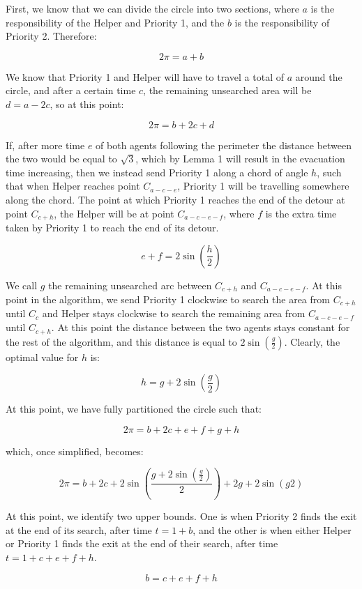 \documentclass[11pt]{article}
\begin{document}
\begin{flushleft}
    First, we know that we can divide the circle into two sections, where $a$ is the
    responsibility of the Helper and Priority 1, and the $b$ is the responsibility of Priority 2.
    Therefore:

    \[ 2\pi = a + b \]

    We know that Priority 1 and Helper will have to travel a total of $a$ around the circle,
    and after a certain time $c$, the remaining unsearched area will be $d = a - 2c$, so at this point:

    \[ 2\pi = b + 2c + d \]

    If, after more time $e$ of both agents following the perimeter the distance between the two
    would be equal to $\sqrt{3}$, which by Lemma 1 will result in the evacuation time increasing, then
    we instead send Priority 1 along a chord of angle $h$, such that when Helper reaches point $C_{a - c - e}$, Priority 1 will be travelling somewhere along the chord. The point at which Priority 1 reaches the
    end of the detour at point $C_{c + h}$, the Helper will be at point $C_{a - c - e - f}$, where $f$ is the extra time taken by Priority 1 to reach the end of its detour.

    \[ e + f = 2\sin(\frac{h}{2}) \]

    We call $g$ the remaining unsearched arc between $C_{c + h}$ and $C_{a - c - e - f}$.
    At this point in the algorithm, we send Priority 1 clockwise to search the area from $C_{c + h}$ until
    $C_{c}$ and Helper stays clockwise to search the remaining area from $C_{a - c - e - f}$ until $C_{c + h}$. At this point the distance between the two agents stays constant for the rest of the algorithm, and this distance is equal to $2\sin(\frac{g}{2})$. Clearly, the optimal value for $h$ is:

    \[ h = g + 2\sin(\frac{g}{2})\]

    At this point, we have fully partitioned the circle such that:

    \[ 2\pi = b + 2c + e + f + g + h\]

    which, once simplified, becomes:

    \[ 2\pi = b + 2c + 2\sin(\frac{g + 2\sin(\frac{g}{2})}{2}) + 2g + 2\sin({g}{2}) \]

    At this point, we identify two upper bounds. One is when Priority 2 finds the exit at the end of its
    search, after time $t = 1 + b$, and the other is when either Helper or Priority 1
    finds the exit at the end of their search, after time $t = 1 + c + e + f + h$.

    \[b = c + e + f + h\]

     


\end{flushleft}

\end{document}
